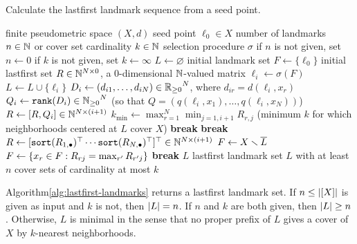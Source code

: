 \documentclass{article}
\begin{document}
\begin{algorithm}
\caption{Calculate the lastfirst landmark sequence from a seed point.}
\label{alg:lastfirst-landmarks}
\begin{algorithmic}[1]
\REQUIRE finite pseudometric space $(X,d)$
\REQUIRE seed point $\ell_0 \in X$
\REQUIRE number of landmarks $n \in \mathbb{N}$ or cover set cardinality $k \in \mathbb{N}$
\REQUIRE selection procedure $\sigma$
\STATE if $n$ is not given, set $n \leftarrow 0$
\label{line:n}
\STATE if $k$ is not given, set $k \leftarrow \infty$
\label{line:k}
\STATE $L \leftarrow \varnothing$ initial landmark set
\STATE $F \leftarrow \{ \ell_0 \}$ initial lastfirst set
\STATE $R \in \mathbb{N}^{N \times 0}$, a $0$-dimensional $\mathbb{N}$-valued matrix
    \STATE $\ell_i \leftarrow \sigma(F)$
    \STATE $L \leftarrow L \cup \{\ell_i\}$
    \STATE $D_i \leftarrow (d_{i1},\ldots,d_{iN}) \in {\mathbb{R}_{\geq 0}}^N$, where $d_{ir} = d(\ell_i, x_r)$
    \STATE $Q_i \leftarrow \verb|rank|(D_i) \in {\bbN_{\geq 0}}^N$ (so that $Q = (q(\ell_i, x_1),\ldots,q(\ell_i, x_N))$)
    \label{line:rank}
    \STATE $R \leftarrow [R, Q_i] \in \mathbb{N}^{N \times (i+1)}$
    \STATE $k_{\min} \leftarrow \max_{r=1}^{N}{ \min_{j=1,i+1}{ R_{r,j} } }$ (minimum $k$ for which neighborhoods centered at $L$ cover $X$)
    \label{line:kmin}
        \STATE \textbf{break}
        \label{line:nonempty}
    \ENDIF
        \STATE \textbf{break}
        \label{line:check}
    \ENDIF
    \STATE $R \leftarrow [ \verb|sort|({R_{1,\bullet}})^\top \cdots \verb|sort|({R_{N,\bullet}})^\top ]^\top \in \bbN^{N \times (i+1)}$
    \label{line:sort}
    \STATE $F \leftarrow X \smallsetminus \overline{L}$
    \label{line:maximize}
        \STATE $F \leftarrow \{x_r \in F : R_{rj} = \max_{r'}{R_{r'j}}\}$
        \label{line:lastfirst}
            \STATE \textbf{break}
        \ENDIF
    \ENDFOR
\ENDFOR
\RETURN $L$
\RETURN lastfirst landmark set $L$ with at least $n$ cover sets of cardinality at most $k$
\end{algorithmic}
\end{algorithm}

\begin{proposition}
Algorithm\nbs\ref{alg:lastfirst-landmarks} returns a lastfirst landmark set.
If $n \leq \lvert [X]\rvert$ is given as input and $k$ is not, then $\lvert L\rvert = n$.
If $n$ and $k$ are both given, then $\lvert L\rvert \geq n$.
Otherwise, $L$ is minimal in the sense that no proper prefix of $L$ gives a cover of $X$ by $k$-nearest neighborhoods.
\end{proposition}
\end{document}
